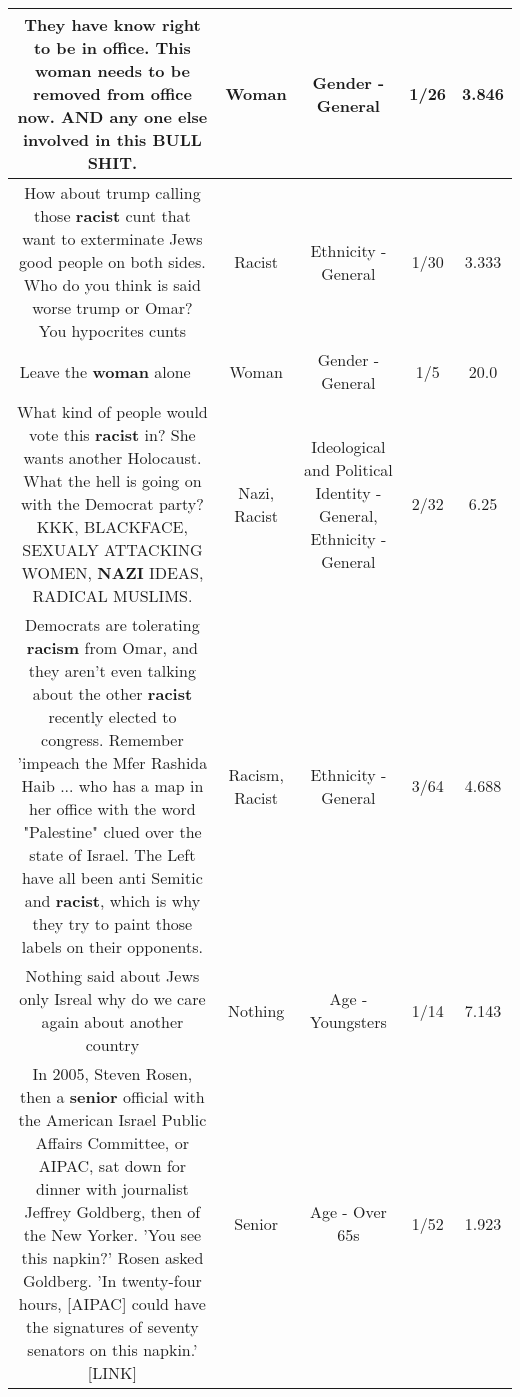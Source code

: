 \documentclass[11pt]{article}
\newlength\mylength
\begin{document}
\begin{center}
\begin{longtable}{|C{.65\mylength}|C{.30\mylength}|C{.12\mylength}|C{.12\mylength}|C{.12\mylength}|}
  \small They have know right to be in office. This \textbf{woman} needs to be removed from office now. AND any one else involved in this BULL SHIT.\normalsize   & Woman & Gender - General & 1/26 & 3.846 \\  \hline
  \small How about trump calling those \textbf{racist} cunt that want to exterminate Jews good people on both sides. Who do you think is said worse trump or Omar? You hypocrites cunts\normalsize   & Racist & Ethnicity - General & 1/30 & 3.333 \\  \hline
  \small Leave the \textbf{woman} alone ✋🏾\normalsize   & Woman & Gender - General & 1/5 & 20.0 \\  \hline
  \small What kind of people would vote this \textbf{racist} in? She wants another Holocaust. What the hell is going on with the Democrat party? KKK, BLACKFACE, SEXUALY ATTACKING WOMEN, \textbf{NAZI} IDEAS, RADICAL MUSLIMS.\normalsize   & Nazi, Racist &  Ideological and Political Identity - General, Ethnicity - General & 2/32 & 6.25 \\  \hline
  \small Democrats are tolerating \textbf{racism} from Omar, and they aren't even talking about the other \textbf{racist} recently elected to congress. Remember 'impeach the Mfer  Rashida Haib ... who has a map in her office with the word "Palestine" clued over the state of Israel.  The Left have all been anti Semitic and \textbf{racist}, which is why they try to paint those labels on their opponents.\normalsize   & Racism, Racist & Ethnicity - General & 3/64 & 4.688 \\  \hline
  \small Nothing said about Jews only Isreal why do we care again about another country\normalsize   & Nothing & Age - Youngsters & 1/14 & 7.143 \\  \hline
  \small In 2005, Steven Rosen, then a \textbf{senior} official with the American Israel Public Affairs Committee, or AIPAC, sat down for dinner with journalist Jeffrey Goldberg, then of the New Yorker. 'You see this napkin?' Rosen asked Goldberg. 'In twenty-four hours, [AIPAC] could have the signatures of seventy senators on this napkin.' [LINK] \normalsize   & Senior & Age - Over 65s & 1/52 & 1.923 \\  \hline

\end{longtable}
\end{center}
\end{document}
